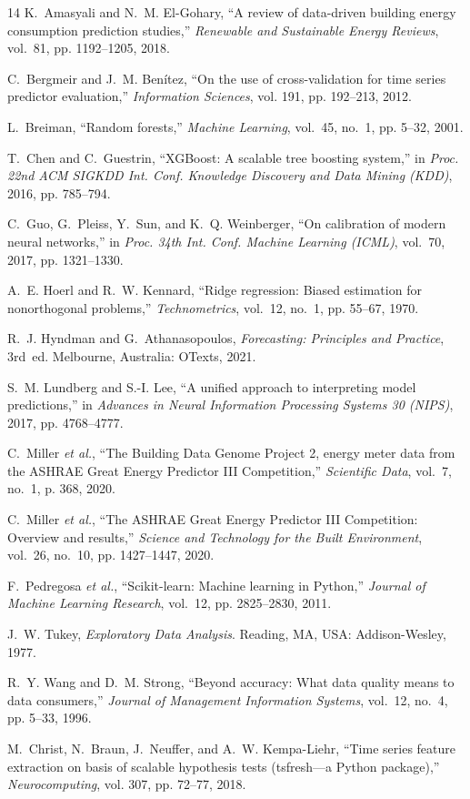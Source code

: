 \documentclass[conference]{IEEEtran}
\begin{document}
\begin{thebibliography}{14}
K.~Amasyali and N.~M. El-Gohary, ``A review of data-driven building energy consumption prediction studies,'' \emph{Renewable and Sustainable Energy Reviews}, vol.~81, pp. 1192--1205, 2018.

C.~Bergmeir and J.~M. Ben\'{i}tez, ``On the use of cross-validation for time series predictor evaluation,'' \emph{Information Sciences}, vol. 191, pp. 192--213, 2012.

L.~Breiman, ``Random forests,'' \emph{Machine Learning}, vol.~45, no.~1, pp. 5--32, 2001.

T.~Chen and C.~Guestrin, ``XGBoost: A scalable tree boosting system,'' in \emph{Proc. 22nd ACM SIGKDD Int. Conf. Knowledge Discovery and Data Mining (KDD)}, 2016, pp. 785--794.

C.~Guo, G.~Pleiss, Y.~Sun, and K.~Q. Weinberger, ``On calibration of modern neural networks,'' in \emph{Proc. 34th Int. Conf. Machine Learning (ICML)}, vol.~70, 2017, pp. 1321--1330.

A.~E. Hoerl and R.~W. Kennard, ``Ridge regression: Biased estimation for nonorthogonal problems,'' \emph{Technometrics}, vol.~12, no.~1, pp. 55--67, 1970.

R.~J. Hyndman and G.~Athanasopoulos, \emph{Forecasting: Principles and Practice}, 3rd~ed. Melbourne, Australia: OTexts, 2021.

S.~M. Lundberg and S.-I. Lee, ``A unified approach to interpreting model predictions,'' in \emph{Advances in Neural Information Processing Systems 30 (NIPS)}, 2017, pp. 4768--4777.

C.~Miller \emph{et al.}, ``The Building Data Genome Project 2, energy meter data from the ASHRAE Great Energy Predictor III Competition,'' \emph{Scientific Data}, vol.~7, no.~1, p. 368, 2020.

C.~Miller \emph{et al.}, ``The ASHRAE Great Energy Predictor III Competition: Overview and results,'' \emph{Science and Technology for the Built Environment}, vol.~26, no.~10, pp. 1427--1447, 2020.

F.~Pedregosa \emph{et al.}, ``Scikit-learn: Machine learning in Python,'' \emph{Journal of Machine Learning Research}, vol.~12, pp. 2825--2830, 2011.

J.~W. Tukey, \emph{Exploratory Data Analysis}. Reading, MA, USA: Addison-Wesley, 1977.

R.~Y. Wang and D.~M. Strong, ``Beyond accuracy: What data quality means to data consumers,'' \emph{Journal of Management Information Systems}, vol.~12, no.~4, pp. 5--33, 1996.

M.~Christ, N.~Braun, J.~Neuffer, and A.~W. Kempa-Liehr, ``Time series feature extraction on basis of scalable hypothesis tests (tsfresh---a Python package),'' \emph{Neurocomputing}, vol. 307, pp. 72--77, 2018.
\end{thebibliography}
\end{document}
